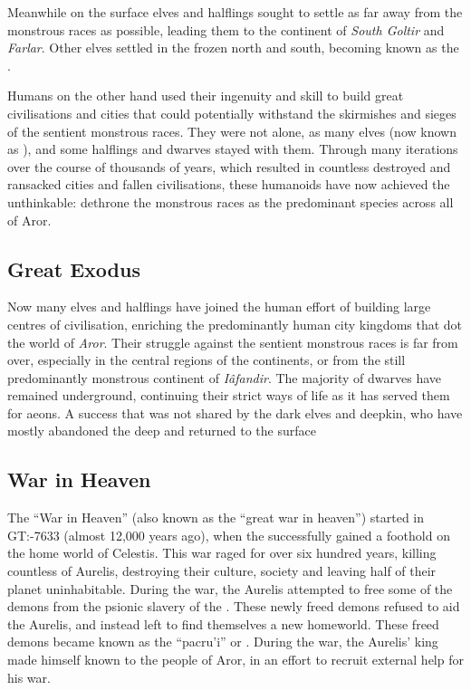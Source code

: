 Meanwhile on the surface elves and halflings sought to settle as far away from
the monstrous races as possible, leading them to the continent of \emph{South
Goltir} and \emph{Farlar}. Other elves settled in the frozen north and south,
becoming known as the .

Humans on the other hand used their ingenuity and skill to build great
civilisations and cities that could potentially withstand the skirmishes and
sieges of the sentient monstrous races. They were not alone, as many elves
(now known as ), and some halflings and dwarves stayed
with them. Through many iterations over the course of thousands of years,
which resulted in countless destroyed and ransacked cities and fallen
civilisations, these humanoids have now achieved the unthinkable: dethrone the
monstrous races as the predominant species across all of Aror.

\subsection{Great Exodus}
\label{sec:Great Exodus}

Now many elves and halflings have joined the human effort of building large
centres of civilisation, enriching the predominantly human city kingdoms that
dot the world of \emph{Aror}. Their struggle against the sentient monstrous
races is far from over, especially in the central regions of the continents,
or from the still predominantly monstrous continent of \emph{Iâfandir}. The
majority of dwarves have remained underground, continuing their strict ways of
life as it has served them for aeons. A success that was not shared by the
dark elves and deepkin, who have mostly abandoned the deep and returned to the
surface

\subsection{War in Heaven}
\label{sec:War in Heaven}

The ``War in Heaven'' (also known as the ``great war in heaven'') started in
GT:-7633 (almost 12,000 years ago), when the  successfully
gained a foothold on the  home world of Celestis. This war
raged for over six hundred years, killing countless of Aurelis, destroying their
culture, society and leaving half of their planet uninhabitable. During the war,
the Aurelis attempted to free some of the demons from the psionic slavery of the
. These newly freed demons refused to aid the Aurelis, and
instead left to find themselves a new homeworld. These freed demons became known
as the ``pacru'i'' or . During the war, the Aurelis' king
 made himself known to the people of Aror, in an effort to
recruit external help for his war.

